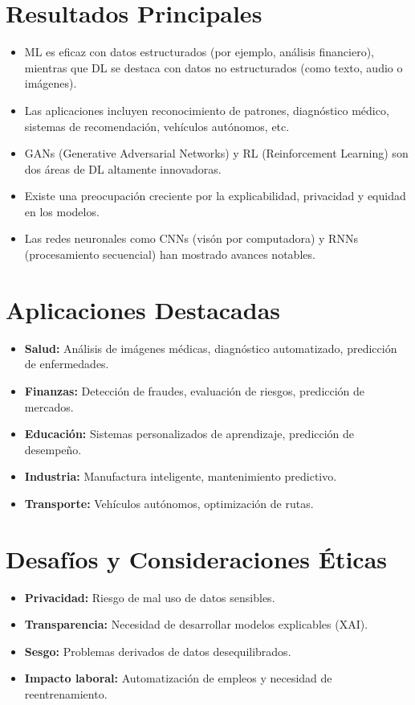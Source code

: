 \documentclass[12pt]{article}
\begin{document}
\section*{Resultados Principales}
\begin{itemize}
    \item ML es eficaz con datos estructurados (por ejemplo, an\'alisis financiero), mientras que DL se destaca con datos no estructurados (como texto, audio o im\'agenes).
    \item Las aplicaciones incluyen reconocimiento de patrones, diagn\'ostico m\'edico, sistemas de recomendaci\'on, veh\'iculos aut\'onomos, etc.
    \item GANs (Generative Adversarial Networks) y RL (Reinforcement Learning) son dos \'areas de DL altamente innovadoras.
    \item Existe una preocupaci\'on creciente por la explicabilidad, privacidad y equidad en los modelos.
    \item Las redes neuronales como CNNs (vis\'on por computadora) y RNNs (procesamiento secuencial) han mostrado avances notables.
\end{itemize}

\section*{Aplicaciones Destacadas}
\begin{itemize}
    \item \textbf{Salud:} An\'alisis de im\'agenes m\'edicas, diagn\'ostico automatizado, predicci\'on de enfermedades.
    \item \textbf{Finanzas:} Detecci\'on de fraudes, evaluaci\'on de riesgos, predicci\'on de mercados.
    \item \textbf{Educaci\'on:} Sistemas personalizados de aprendizaje, predicci\'on de desempe\~no.
    \item \textbf{Industria:} Manufactura inteligente, mantenimiento predictivo.
    \item \textbf{Transporte:} Veh\'iculos aut\'onomos, optimizaci\'on de rutas.
\end{itemize}

\section*{Desaf\'ios y Consideraciones \'Eticas}
\begin{itemize}
    \item \textbf{Privacidad:} Riesgo de mal uso de datos sensibles.
    \item \textbf{Transparencia:} Necesidad de desarrollar modelos explicables (XAI).
    \item \textbf{Sesgo:} Problemas derivados de datos desequilibrados.
    \item \textbf{Impacto laboral:} Automatizaci\'on de empleos y necesidad de reentrenamiento.
\end{itemize}
\end{document}
